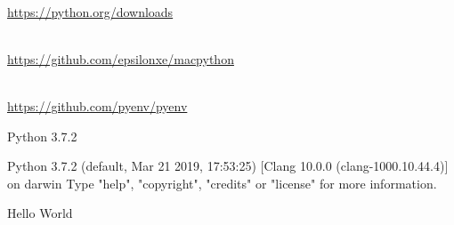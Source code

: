 \documentclass{beamer}
\begin{document}
\hbg
\begin{frame}
\begin{tcolorbox}[title={Windows}, colframe=blue!60]
\centering
{}
\vspace{2mm}\\
\url{https://python.org/downloads}
\end{tcolorbox}
\begin{tcolorbox}[title={macOS}, colframe=gray]
\centering
{}
\vspace{2mm}\\
{\url{https://github.com/epsilonxe/macpython}}
\end{tcolorbox}
\begin{tcolorbox}[title={Linux}, colframe=onion]
\centering
{}
\vspace{2mm}\\
\url{https://github.com/pyenv/pyenv}
\end{tcolorbox}
\end{frame}
\vbg
\begin{frame}[fragile]
\begin{terminal}
\begin{sho}
Python 3.7.2 
\end{sho}
\begin{sho}
Python 3.7.2 (default, Mar 21 2019, 17:53:25)
[Clang 10.0.0 (clang-1000.10.44.4)] on darwin
Type "help", "copyright", "credits" or "license"
for more information. 
\end{sho}
\pyi{}   
\end{terminal}
\end{frame}
\vbg
\begin{frame}[fragile]
\begin{terminal}
\begin{sho}
Hello World    
\end{sho}
\\
\shi{}
\end{terminal}
\end{frame}
\end{document}

